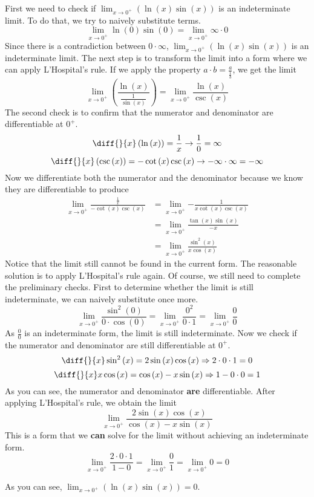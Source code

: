 \documentclass{article}
\begin{document}
\begin{enumerate}[label=\textbf{(12.\arabic*)}]
First we need to check if $\lim_{x\to0^{+}} {\left(\ln{(x)}\sin{(x)}\right)}$ is an indeterminate limit. To do that, we try to naively substitute terms.
\[\lim_{x\to0^{+}} {\ln{(0)}\sin{(0)}}=\lim_{x\to0^{+}} {\infty\cdot0}\]
Since there is a contradiction between $0\cdot\infty$, $\lim_{x\to0^{+}} {\left(\ln{(x)}\sin{(x)}\right)}$ is an indeterminate limit. %
The next step is to transform the limit into a form where we can apply L'Hospital's rule. If we apply the property $a\cdot b=\frac{a}{\frac{1}{b}}$, we get the limit
\[\lim_{x\to0^{+}} {\left(\frac{\ln{(x)}}{\frac{1}{\sin{(x)}}}\right)}=\lim_{x \to 0^+} {\frac{\ln{(x)}}{\csc{(x)}}}\] %
The second check is to confirm that the numerator and denominator are differentiable at $0^+$.\
\[\diff{}{x}\left(\ln{(x)}\right)=\frac{1}{x} \rightarrow \frac{1}{0}=\infty\]
\[\diff{}{x}\left(\csc{(x)}\right)=-\cot{(x)}\csc{(x)} \rightarrow -\infty\cdot \infty = -\infty\] %
Now we differentiate both the numerator and the denominator because we know they are differentiable to produce
\begin{align*}
\lim_{x \to 0^+} {\frac{\frac{1}{x}}{-\cot{(x)}\csc{(x)}}}&=\lim_{x \to 0^+} {-\frac{1}{x\cot{(x)}\csc{(x)}}} \\
&=\lim_{x \to 0^+} {\frac{\tan{(x)}\sin{(x)}}{-x}} \\
&=\lim_{x \to 0^+} {\frac{\sin^2{(x)}}{x\cos{(x)}}}
\end{align*} %
Notice that the limit still cannot be found in the current form. The reasonable solution is to apply L'Hospital's rule again. Of course, we still need to complete the preliminary checks. First to determine whether the limit is still indeterminate, we can naively substitute once more.
\[\lim_{x \to 0^+} {\frac{\sin^2{(0)}}{0\cdot\cos{(0)}}}=\lim_{x \to 0^+} {\frac{0^2}{0\cdot1}}=\lim_{x \to 0^+} {\frac{0}{0}}\]
As $\frac{0}{0}$ is an indeterminate form, the limit is still indeterminate. Now we check if the numerator and denominator are still differentiable at $0^+$. %
\[\diff{}{x}\sin^2{(x)}=2\sin{(x)}\cos{(x)} \Rightarrow 2\cdot0\cdot1=0\]
\[\diff{}{x}x\cos{(x)}=\cos{(x)}-x\sin{(x)} \Rightarrow 1-0\cdot0=1\]
As you can see, the numerator and denominator \textbf{are} differentiable. After applying L'Hospital's rule, we obtain the limit %
\[\lim_{x \to 0^+} {\frac{2\sin{(x)}\cos{(x)}}{\cos{(x)}-x\sin{(x)}}}\] %
This is a form that we \textbf{can} solve for the limit without achieving an indeterminate form.
\[\lim_{x \to 0^+} {\frac{2\cdot0\cdot1}{1-0}}=\lim_{x \to 0^+} {\frac{0}{1}}=\lim_{x \to 0^+} {0}=0\] %
\begin{tcolorbox}[colback=white]
As you can see, $\lim_{x\to0^{+}} {\left(\ln{(x)}\sin{(x)}\right)}=0$. %
\centering
\end{tcolorbox} 
\bigskip


\end{enumerate}
\end{document}
